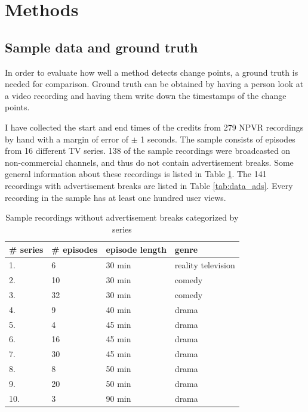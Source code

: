

\section{Methods} \label{sec:casestudy}

\subsection{Sample data and ground truth} \label{subsec:groundtruth}

In order to evaluate how well a method detects change points, a ground truth is needed for comparison. Ground truth can be obtained by having a person look at a video recording and having them write down the timestamps of the change points.

I have collected the start and end times of the credits from 279 NPVR recordings by hand with a margin of error of $\pm$ 1 seconds. The sample consists of episodes from 16 different TV series. 138 of the sample recordings were broadcasted on non-commercial channels, and thus do not contain advertisement breaks. Some general information about these recordings is listed in Table \ref{tab:data_no_ads}. The 141 recordings with advertisement breaks are listed in Table \ref{tab:data_ads}. Every recording in the sample has at least one hundred user views.

\begin{table}[H]
    \begin{center}
    \begin{tabular}{|p{15mm}|p{20mm}|p{28mm}|p{30mm}|} %
        \hline
        \textbf{\# series} & \textbf{\# episodes} & \textbf{episode length} & \textbf{genre}  \\ \hline
        1. &  6 & 30 min & reality television\\ \hline
        2. & 10 & 30 min & comedy\\ \hline
        3. & 32 & 30 min & comedy\\ \hline
        4. &  9 & 40 min & drama\\ \hline
        5. &  4 & 45 min & drama\\ \hline
        6. &  16 & 45 min & drama\\ \hline
        7. & 30 & 45 min & drama\\ \hline
        8. &  8 & 50 min & drama\\ \hline
        9. & 20 & 50 min & drama\\ \hline
        10. & 3 & 90 min & drama\\ \hline
    \end{tabular}
    \end{center}
    \caption{Sample recordings without advertisement breaks categorized by series}
    \label{tab:data_no_ads}
\end{table}


